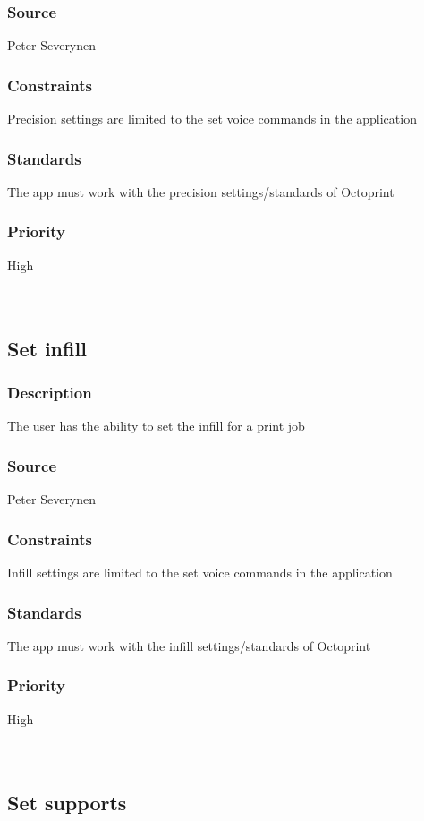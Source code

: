 \subsubsection{Source}
Peter Severynen
\subsubsection{Constraints}
Precision settings are limited to the set voice commands in the application
\subsubsection{Standards}
The app must work with the precision settings/standards of Octoprint
\subsubsection{Priority}
High\\
\\
\\
\subsection{Set infill}
\subsubsection{Description}
The user has the ability to set the infill for a print job
\subsubsection{Source}
Peter Severynen
\subsubsection{Constraints}
Infill settings are limited to the set voice commands in the application
\subsubsection{Standards}
The app must work with the infill settings/standards of Octoprint
\subsubsection{Priority}
High\\
\\
\\
\subsection{Set supports}
